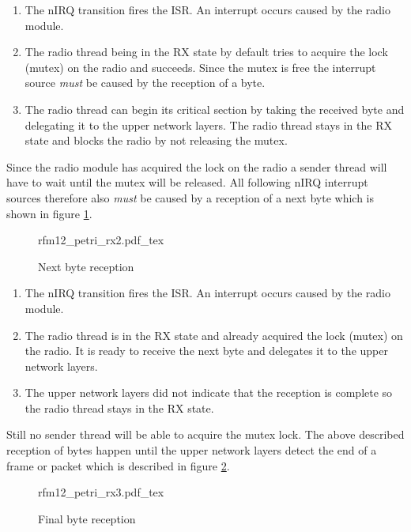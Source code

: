 \begin{enumerate}
    \item The nIRQ transition fires the ISR. An interrupt occurs caused by the radio module.
    \item The radio thread being in the RX state by default tries to acquire the lock (mutex) on the radio and succeeds. Since the mutex is free the interrupt source \emph{must} be caused by the reception of a byte.
    \item The radio thread can begin its critical section by taking the received byte and delegating it to the upper network layers. The radio thread stays in the RX state and blocks the radio by not releasing the mutex.
\end{enumerate}

Since the radio module has acquired the lock on the radio a sender thread will have to wait until the mutex will be released. All following nIRQ interrupt sources therefore also \emph{must} be caused by a reception of a next byte which is shown in figure \ref{fig:petri-rx2}.

\begin{figure}[H]
\centering
{rfm12_petri_rx2.pdf_tex}
\caption{Next byte reception}
\label{fig:petri-rx2}
\end{figure}

\begin{enumerate}
    \item The nIRQ transition fires the ISR. An interrupt occurs caused by the radio module.
    \item The radio thread is in the RX state and already acquired the lock (mutex) on the radio. It is ready to receive the next byte and delegates it to the upper network layers.
    \item The upper network layers did not indicate that the reception is complete so the radio thread stays in the RX state.
\end{enumerate}

Still no sender thread will be able to acquire the mutex lock. The above described reception of bytes happen until the upper network layers detect the end of a frame or packet which is described in figure \ref{fig:petri-rx3}.

\begin{figure}[H]
\centering
{rfm12_petri_rx3.pdf_tex}
\caption{Final byte reception}
\label{fig:petri-rx3}
\end{figure}

